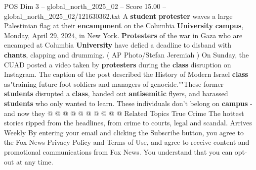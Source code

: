 \begin{textsample}{POS Dim 3 – global\_north\_2025\_02 – Score 15.00 – global\_north\_2025\_02/121630362.txt}
A \textbf{student} \textbf{protester} waves a large Palestinian flag at their \textbf{encampment} on the Columbia \textbf{University} \textbf{campus}, Monday, April 29, 2024, in New York. \textbf{Protesters} of the war in Gaza who are encamped at Columbia \textbf{University} have defied a deadline to disband with \textbf{chants}, clapping and drumming. ( AP Photo/Stefan Jeremiah ) On Sunday, the CUAD posted a video taken by \textbf{protesters} during the \textbf{class} disruption on Instagram.
The caption of the post described the History of Modern Israel \textbf{class} as"training future foot soldiers and managers of genocide.""These former \textbf{students} disrupted a \textbf{class}, handed out \textbf{antisemitic} flyers, and harassed \textbf{students} who only wanted to learn.
These individuals don't belong on \textbf{campus} - and now they @ @ @ @ @ @ @ @ @ @ Related Topics True Crime The hottest stories ripped from the headlines, from crime to courts, legal and scandal.
Arrives Weekly By entering your email and clicking the Subscribe button, you agree to the Fox News Privacy Policy and Terms of Use, and agree to receive content and promotional communications from Fox News.
You understand that you can opt-out at any time.

\end{textsample}
